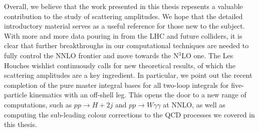 \documentclass[main.tex]{subfiles}
\begin{document}
Overall, we believe that the work presented in this thesis repesents a valuable contribution to the study of scattering amplitudes. We hope that the detailed introductory material serves as a useful reference for those new to the subject. With more and more data pouring in from the LHC and future colliders, it is clear that further breakthroughs in our computational techniques are needed to fully control the NNLO frontier and move towards the N$^3$LO one. The Les Houches wishlist continuously calls for new theoretical results, of which the scattering amplitudes are a key ingredient. In particular, we point out the recent completion of the pure master integral bases for all two-loop integrals for five-particle kinematics with an off-shell leg. This opens the door to a new range of computations, such as $pp \rightarrow H+2j$ and $pp \rightarrow W \gamma \gamma $ at NNLO, as well as computing the sub-leading colour corrections to the QCD processes we covered in this thesis.
\end{document}
